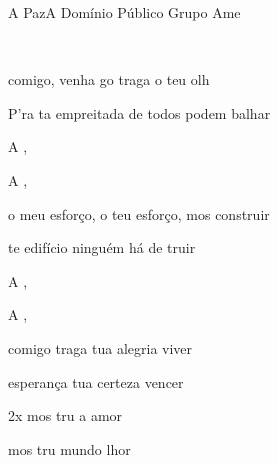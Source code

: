 \documentclass[a4,12pt,oneside]{book}
\newcommand{\RevDate}{\today}
\newcommand{\NotCCLIed}{\relax}
\renewcommand{\SBPubDom}{Domínio Público}
\begin{document}
\begin{song}{A Paz}{A}
  {\SBPubDom}
  {Grupo Ame}
  {}
  {\NotCCLIed}
  
	\renewcommand{\RevDate}{23 de julho de 2014}


	\ifChordBk
		{\vspace{-2em}\flushright{\Achord \quad \Dchord \quad \ACsuschord \quad \Bmchord}\\}
		\vspace{-1em}
	\fi
		
	\begin{SBVerse}
		 comigo, venha go traga o teu olh
		
		P'ra ta empreitada de todos podem balhar
	\end{SBVerse}
	
	\begin{SBBracket}{}
		A ,  \Ch{Bm}{paz}
		
		A ,   ~ \Ch{A}{}
	\end{SBBracket}
	
	\begin{SBVerse}
		 o meu esforço,  o teu esforço, mos construir
		
		te edifício  ninguém há de truir
	\end{SBVerse}
	
	\begin{SBBracket}{}
		A ,  
		
		A ,   ~ 
	\end{SBBracket}
	
	\begin{SBVerse}
		 comigo traga  tua alegria  viver
		
		 esperança  tua certeza  vencer
	\end{SBVerse}
	
	\begin{SBBracket}{2x}
		 mos tru a   amor
		
		 mos tru  mundo \Ch{Bm}{me}lhor
	\end{SBBracket}

	\begin{SBOpGroup}
		~  ~  ~  ~ \\
	\end{SBOpGroup}
\end{song}
\end{document}
